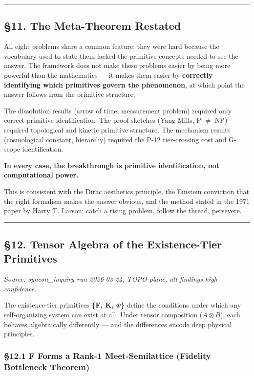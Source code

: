 \documentclass[12pt,a4paper]{article}
\newcommand{\pilcrow}{\S}
\begin{document}
\begin{center}
\rule{0.5\textwidth}{0.4pt}
\end{center}

\subsection{\pilcrow{}11. The Meta-Theorem Restated}

All eight problems share a common feature: they were hard because the vocabulary used to state them lacked the primitive concepts needed to see the answer. The framework does not make these problems easier by being more powerful than the mathematics --- it makes them easier by \textbf{correctly identifying which primitives govern the phenomenon}, at which point the answer follows from the primitive structure.

The dissolution results (arrow of time, measurement problem) required only correct primitive identification. The proof-sketches (Yang-Mills, P $\neq$ NP) required topological and kinetic primitive structure. The mechanism results (cosmological constant, hierarchy) required the P-12 tier-crossing cost and G-scope identification.

\textbf{In every case, the breakthrough is primitive identification, not computational power.}

This is consistent with the Dirac aesthetics principle, the Einstein conviction that the right formalism makes the answer obvious, and the method stated in the 1971 paper by Harry T. Larson: catch a rising problem, follow the thread, persevere.

\begin{center}
\rule{0.5\textwidth}{0.4pt}
\end{center}

\subsection{\pilcrow{}12. Tensor Algebra of the Existence-Tier Primitives}

\emph{Source: syncon\_inquiry run 2026-03-24, TOPO-plane, all findings high confidence.}

The existence-tier primitives \textbf{\{F, K, $\Phi$\}} define the conditions under which any self-organizing system can exist at all. Under tensor composition ($A \otimes B$), each behaves algebraically differently --- and the differences encode deep physical principles.

\subsubsection{\pilcrow{}12.1 F Forms a Rank-1 Meet-Semilattice (Fidelity Bottleneck Theorem)}
\end{document}
